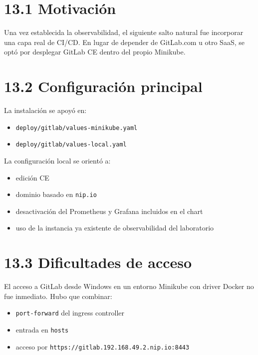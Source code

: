 \documentclass[
a4paper,
12pt]{report}
\providecommand{\tightlist}{%
  \setlength{\itemsep}{0pt}\setlength{\parskip}{0pt}}
\begin{document}
\section{13.1 Motivación}\label{motivaciuxf3n}

Una vez establecida la observabilidad, el siguiente salto natural fue
incorporar una capa real de CI/CD. En lugar de depender de GitLab.com u
otro SaaS, se optó por desplegar GitLab CE dentro del propio Minikube.

\section{13.2 Configuración principal}\label{configuraciuxf3n-principal}

La instalación se apoyó en:

\begin{itemize}
\tightlist
\item
  \texttt{deploy/gitlab/values-minikube.yaml}
\item
  \texttt{deploy/gitlab/values-local.yaml}
\end{itemize}

La configuración local se orientó a:

\begin{itemize}
\tightlist
\item
  edición CE
\item
  dominio basado en \texttt{nip.io}
\item
  desactivación del Prometheus y Grafana incluidos en el chart
\item
  uso de la instancia ya existente de observabilidad del laboratorio
\end{itemize}

\section{13.3 Dificultades de acceso}\label{dificultades-de-acceso}

El acceso a GitLab desde Windows en un entorno Minikube con driver
Docker no fue inmediato. Hubo que combinar:

\begin{itemize}
\tightlist
\item
  \texttt{port-forward} del ingress controller
\item
  entrada en \texttt{hosts}
\item
  acceso por \texttt{https://gitlab.192.168.49.2.nip.io:8443}
\end{itemize}
\end{document}

